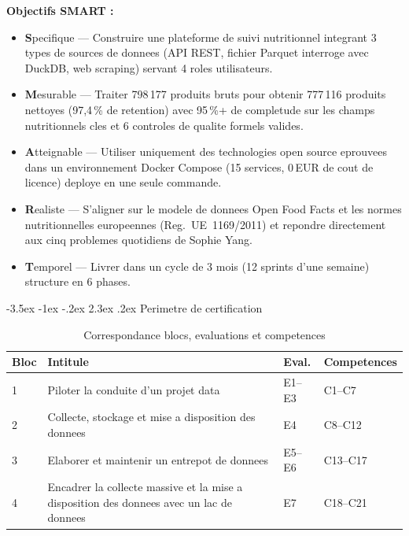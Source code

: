 \documentclass[a4paper,11pt,oneside,openany]{report}
\makeatletter
\renewcommand\section{\@startsection{section}{1}{\z@}%
  {-3.5ex \@plus -1ex \@minus -.2ex}%
  {2.3ex \@plus.2ex}%
  {\normalfont\Large\bfseries\color{ntgreen}}}
\newcommand{\off}{Open Food Facts}
\makeatother
\begin{document}
\textbf{Objectifs SMART :}
\begin{itemize}[nosep]
  \item \textbf{S}pecifique --- Construire une plateforme de suivi nutritionnel
        integrant 3 types de sources de donnees (API REST, fichier Parquet
        interroge avec DuckDB, web scraping) servant 4 roles utilisateurs.
  \item \textbf{M}esurable --- Traiter 798\,177 produits bruts pour obtenir
        777\,116 produits nettoyes (97,4\,\% de retention) avec 95\,\%+ de
        completude sur les champs nutritionnels cles et 6 controles de qualite
        formels valides.
  \item \textbf{A}tteignable --- Utiliser uniquement des technologies open source
        eprouvees dans un environnement Docker Compose (15 services,
        0\,EUR de cout de licence) deploye en une seule commande.
  \item \textbf{R}ealiste --- S'aligner sur le modele de donnees \off{} et les
        normes nutritionnelles europeennes (Reg.~UE~1169/2011) et repondre
        directement aux cinq problemes quotidiens de Sophie Yang.
  \item \textbf{T}emporel --- Livrer dans un cycle de 3 mois (12 sprints
        d'une semaine) structure en 6 phases.
\end{itemize}

\section{Perimetre de certification}

\begin{table}[H]
\centering
\caption{Correspondance blocs, evaluations et competences}
\label{tab:bloc-eval}
\begin{tabularx}{\textwidth}{C{1.5cm} L{5cm} C{1.5cm} L{4cm}}
\toprule
\textbf{Bloc} & \textbf{Intitule} & \textbf{Eval.} & \textbf{Competences} \\
 & Piloter la conduite d'un projet data & E1--E3 & C1--C7 \\
2 & Collecte, stockage et mise a disposition des donnees & E4 & C8--C12 \\
3 & Elaborer et maintenir un entrepot de donnees & E5--E6 & C13--C17 \\
4 & Encadrer la collecte massive et la mise a disposition des donnees avec un lac de donnees & E7 & C18--C21 \\
\bottomrule
\end{tabularx}
\end{table}
\end{document}

